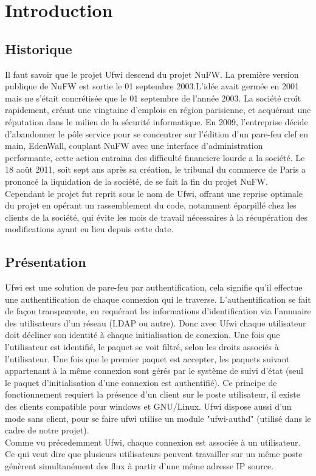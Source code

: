 \documentclass[12pt]{report}
\begin{document}
\newpage

\chapter{Introduction}
\section{Historique}
Il faut savoir que le projet Ufwi descend du projet NuFW.
La première version publique de NuFW est sortie le 01 septembre 2003.L’idée avait germée en 2001 mais ne s’était concrétisée que le 01 septembre de l’année 2003. La société croît rapidement, créant une vingtaine d'emplois en région parisienne, et acquérant une réputation dans le milieu de la sécurité informatique. En 2009, l'entreprise décide d'abandonner le pôle service pour se concentrer sur l'édition d'un pare-feu clef en main, EdenWall, couplant NuFW avec une interface d'administration performante, cette action entraina des difficulté financiere lourde a la société.
Le 18 août 2011, soit sept ans après sa création, le tribunal du commerce de Paris a prononcé la liquidation de la société, de se fait la fin du projet NuFW.\\
Cependant le projet fut reprit sous le nom de Ufwi, offrant une reprise optimale du projet en opérant un rassemblement du code, notamment éparpillé chez les clients de la société, qui évite les mois de travail nécessaires à la récupération des modifications ayant eu lieu depuis cette date.
\section{Présentation}
Ufwi est une solution de pare-feu par authentification, cela signifie qu'il effectue une authentification de chaque connexion qui le traverse. L'authentification se fait de façon transparente, en requérant les informations d’identification via l'annuaire des utilisateurs d'un réseau (LDAP ou autre). Donc avec Ufwi chaque utilisateur doit décliner son identité à chaque initialisation de conexion. Une fois que l'utilisateur est identifié, le paquet se voit filtré, selon les droits associés à l'utilisateur. Une fois que le premier paquet est accepter, les paquets suivant appartenant à la même connexion sont gérés par le système de suivi d'état (seul le paquet d'initialisation d'une connexion est authentifié). Ce principe de fonctionnement requiert la présence d'un client sur le poste utilisateur, il existe des clients compatible pour windows et GNU/Linux.
Ufwi dispose aussi d'un mode sans client, pour se faire ufwi utilise un module "ufwi-authd" (utilisé dans le cadre de notre projet).\\
Comme vu précedemment Ufwi, chaque connexion est associée à un utilisateur. Ce qui veut dire que plusieurs utilisateurs peuvent travailler sur un même poste génèrent simultanément des flux à partir d'une même adresse IP source.
\end{document}
